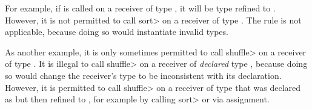 For example, if  is called on a receiver of type
, it will be type refined to
. However, it is not permitted to
call \<sort> on a receiver of type .  The rule is not applicable, because doing so would
instantiate invalid types.


As another example, it is only sometimes permitted to call \<shuffle> on a receiver of
type .  It is illegal to call \<shuffle> on a
receiver of \emph{declared} type , because doing so would change
the receiver's type to be inconsistent with its declaration.  However, it
is permitted to call \<shuffle> on a receiver of type  that was declared as  but then refined to , for example by
calling \<sort> or via assignment.


